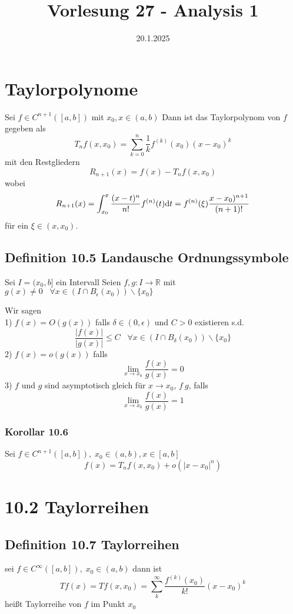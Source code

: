 \documentclass[]{scrartcl}
\title{Vorlesung 27 - Analysis 1}
\author{}
\date{20.1.2025}
\begin{document}
\maketitle
\newpage
\tableofcontents
\newpage

\section{Taylorpolynome} 
Sei $f\in C^{n+1}([a,b])$ mit $x_0,x\in(a,b)$ Dann ist das Taylorpolynom von $f$ gegeben als
\begin{equation}
	T_nf(x,x_0) = \sum_{k=0}^{n} \frac{1}{k}f^{(k)}(x_0)(x-x_0)^k
\end{equation}
mit den Restgliedern
$$
R_{n+1}(x) = f(x) - T_nf(x,x_0)
$$
wobei
$$
R_{n+1}(x) = \int_{x_0}^{x}\frac{(x-t)^n}{n!}f^{(n)}(t)\text dt = f^{(n)}(\xi)\frac{x-x_0)^{n+1}}{(n+1)!}
$$
für ein $\xi\in(x,x_0)$.

\subsection{Definition 10.5 Landausche Ordnungssymbole}
Sei $I = (x_0,b]$ ein Intervall Seien $f,g: I\rightarrow\mathbb R$ mit $g(x) \neq 0 \;\;\; \forall x\in (I\cap B_\epsilon(x_0))\backslash \{x_0\}$

Wir sagen\\ 1) $f(x) = O(g(x))$ falls $\delta\in(0,\epsilon)$ und $C>0$ existieren s.d.
$$
\frac{|f(x)|}{|g(x)|} \leq C\;\;\; \forall x\in(I\cap B_\delta(x_0))\backslash \{x_0\}
$$
2) $f(x) = o(g(x))$ falls 
$$
\lim_{x\rightarrow x_0} \frac{f(x)}{g(x)} = 0
$$
3) $f$ und $g$ sind asymptotisch gleich für $x\rightarrow x_0$, $f~g$, falls
$$
\lim_{x\rightarrow x_0} \frac{f(x)}{g(x)} = 1
$$
\subsubsection{Korollar 10.6}
Sei $f\in C^{n+1}([a,b]),\;x_0\in(a,b),x\in[a,b]$
$$
f(x) = T_nf(x,x_0) + o(|x-x_0|^n)
$$

\section{10.2 Taylorreihen}

\subsection{Definition 10.7 Taylorreihen}

sei $f\in C^\infty([a,b]), \;x_0\in(a,b)$ dann ist
\begin{equation}
	Tf(x) = Tf(x,x_0) = \sum_k^\infty \frac{f^{(k)}(x_0)}{k!}(x-x_0)^k
\end{equation}
heißt Taylorreihe von $f$ im Punkt $x_0$
\end{document}
